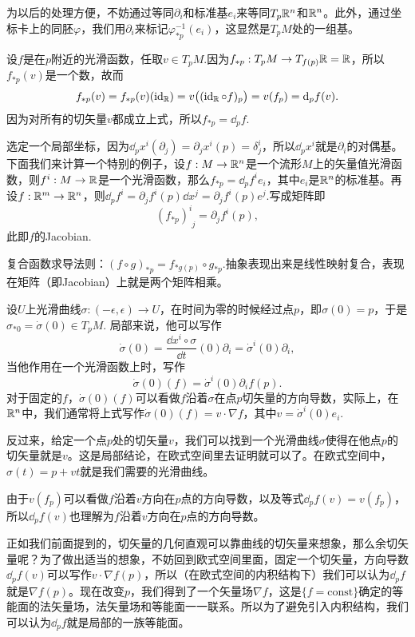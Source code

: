 为以后的处理方便，不妨通过等同$\partial_i$和标准基$e_i$来等同$T_p\mathbb{R}^n$和$\mathbb{R}^n$。此外，通过坐标卡上的同胚$\varphi$，我们用$\partial_i$来标记$\varphi^{-1}_{*p}(e_i)$，这显然是$T_pM$处的一组基。


\para 设$f$是在$p$附近的光滑函数，任取$v\in T_pM$.因为$f_{*p}:T_pM\to T_{f(p)}\mathbb{R}=\mathbb{R}$，所以$f_{*p}(v)$是一个数，故而
	\[
		f_{*p}(v)=f_{*p}(v)(\operatorname{id}_{\mathbb{R}})=v\bigl((\operatorname{id}_{\mathbb{R}}\circ f)_p\bigr)=v(f_p)=\mathrm{d}_p f(v).
	\]
	因为对所有的切矢量$v$都成立上式，所以$f_{*p}=\dd_p f$.

选定一个局部坐标，因为$\dd_p x^i(\partial_j)=\partial_jx^i(p)=\delta^i_j$，所以$\dd_p x^i$就是$\partial_i$的对偶基。下面我们来计算一个特别的例子，设$f:M\to \mathbb{R}^n$是一个流形$M$上的矢量值光滑函数，则$f^i:M\to \mathbb{R}$是一个光滑函数，那么$f_{*p}=\dd_pf^i e_i$，其中$e_i$是$\mathbb{R}^n$的标准基。再设$f:\mathbb{R}^m\to \mathbb{R}^n$，则$\dd_pf^i=\partial_j f^i(p) \dd x^j=\partial_j f^i(p) e^j$.写成矩阵即
\[
	(f_{*p})^{i}_{\phantom{i}j}=\partial_j f^i(p),
\]
此即$f$的Jacobian.

\para 复合函数求导法则：$(f\circ g)_{*p}=f_{*g(p)}\circ g_{*p}$.抽象表现出来是线性映射复合，表现在矩阵（即Jacobian）上就是两个矩阵相乘。

\para 设$U$上光滑曲线$\sigma:(-\epsilon,\epsilon)\to U$，在时间为零的时候经过点$p$，即$\sigma(0)=p$，于是$\sigma_{*0}=\dot\sigma(0)\in T_pM$. 局部来说，他可以写作
\[
	\dot{\sigma}(0)=\frac{\dd x^i\circ \sigma}{\dd t}(0)\partial_i=\dot \sigma^i(0)\partial_i,
\]
当他作用在一个光滑函数上时，写作
\[
	\dot{\sigma}(0)(f)=\dot \sigma^i(0)\partial_if(p).
\]
对于固定的$f$，$\dot{\sigma}(0)(f)$可以看做$f$沿着$\sigma$在点$p$切矢量的方向导数，实际上，在$\mathbb{R}^n$中，我们通常将上式写作$\dot{\sigma}(0)(f)=v\cdot \nabla f$，其中$v=\dot \sigma^i(0)e_i$.

\para 反过来，给定一个点$p$处的切矢量$v$，我们可以找到一个光滑曲线$\sigma$使得在他点$p$的切矢量就是$v$。这是局部结论，在欧式空间里去证明就可以了。在欧式空间中，$\sigma(t)=p+vt$就是我们需要的光滑曲线。

\para 由于$v(f_p)$可以看做$f$沿着$v$方向在$p$点的方向导数，以及等式$\dd_pf(v)=v(f_p)$，所以$\dd_pf(v)$也理解为$f$沿着$v$方向在$p$点的方向导数。

\para 正如我们前面提到的，切矢量的几何直观可以靠曲线的切矢量来想象，那么余切矢量呢？为了做出适当的想象，不妨回到欧式空间里面，固定一个切矢量，方向导数$\dd_pf(v)$可以写作$v\cdot \nabla f(p)$，所以（在欧式空间的内积结构下）我们可以认为$\dd_pf$就是$\nabla f(p)$。现在改变$p$，我们得到了一个矢量场$\nabla f$，这是$\{f=\text{const}\}$确定的等能面的法矢量场，法矢量场和等能面一一联系。所以为了避免引入内积结构，我们可以认为$\dd_pf$就是局部的一族等能面。

